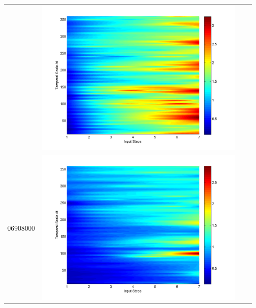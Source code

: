 \documentclass[11pt]{article}
\begin{document}
\begin{table}[H]
{\begin{tabular}{cccc}
&\begin{minipage}{.3\textwidth}\includegraphics[width=\linewidth]{resultgraph/05585000pepq.png}\end{minipage}
\\
06908000&\begin{minipage}{.3\textwidth}\includegraphics[width=\linewidth]{resultgraph/06908000p.png}\end{minipage}

\end{tabular}}
\end{table}
\end{document}
